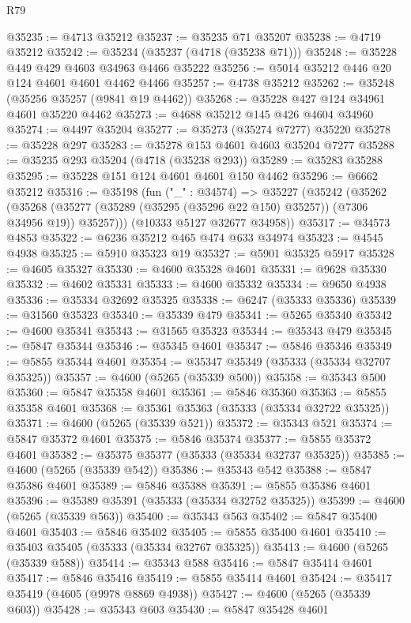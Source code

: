 \begin{lexlean}{R79}
\begin{coremodule}
@35235 := @4713 @35212
@35237 := @35235 @71 @35207
@35238 := @4719 @35212
@35242 := @35234 (@35237 (@4718 (@35238 @71)))
@35248 := @35228 @449 @429 @4603 @34963 @4466 @35222
@35256 := @5014 @35212 @446 @20 @124 @4601 @4601 @4462 @4466
@35257 := @4738 @35212
@35262 := @35248 (@35256 @35257 (@9841 @19 @4462))
@35268 := @35228 @427 @124 @34961 @4601 @35220 @4462
@35273 := @4688 @35212 @145 @426 @4604 @34960
@35274 := @4497 @35204
@35277 := @35273 (@35274 @7277) @35220
@35278 := @35228 @297
@35283 := @35278 @153 @4601 @4603 @35204 @7277
@35288 := @35235 @293 @35204 (@4718 (@35238 @293))
@35289 := @35283 @35288
@35295 := @35228 @151 @124 @4601 @4601 @150 @4462
@35296 := @6662 @35212
@35316 := @35198
    (fun ("_" : @34574) =>
    @35227
      (@35242
        (@35262
          (@35268 (@35277 (@35289 (@35295 (@35296 @22 @150) @35257)) (@7306 @34956 @19)) @35257)))
      (@10333 @5127 @32677 @34958))
@35317 := @34573 @4853
@35322 := @6236 @35212 @465 @474 @633 @34974
@35323 := @4545 @4938
@35325 := @5910 @35323 @19
@35327 := @5901 @35325 @5917
@35328 := @4605 @35327
@35330 := @4600 @35328 @4601
@35331 := @9628 @35330
@35332 := @4602 @35331
@35333 := @4600 @35332
@35334 := @9650 @4938
@35336 := @35334 @32692 @35325
@35338 := @6247 (@35333 @35336)
@35339 := @31560 @35323
@35340 := @35339 @479
@35341 := @5265 @35340
@35342 := @4600 @35341
@35343 := @31565 @35323
@35344 := @35343 @479
@35345 := @5847 @35344
@35346 := @35345 @4601
@35347 := @5846 @35346
@35349 := @5855 @35344 @4601
@35354 := @35347 @35349 (@35333 (@35334 @32707 @35325))
@35357 := @4600 (@5265 (@35339 @500))
@35358 := @35343 @500
@35360 := @5847 @35358 @4601
@35361 := @5846 @35360
@35363 := @5855 @35358 @4601
@35368 := @35361 @35363 (@35333 (@35334 @32722 @35325))
@35371 := @4600 (@5265 (@35339 @521))
@35372 := @35343 @521
@35374 := @5847 @35372 @4601
@35375 := @5846 @35374
@35377 := @5855 @35372 @4601
@35382 := @35375 @35377 (@35333 (@35334 @32737 @35325))
@35385 := @4600 (@5265 (@35339 @542))
@35386 := @35343 @542
@35388 := @5847 @35386 @4601
@35389 := @5846 @35388
@35391 := @5855 @35386 @4601
@35396 := @35389 @35391 (@35333 (@35334 @32752 @35325))
@35399 := @4600 (@5265 (@35339 @563))
@35400 := @35343 @563
@35402 := @5847 @35400 @4601
@35403 := @5846 @35402
@35405 := @5855 @35400 @4601
@35410 := @35403 @35405 (@35333 (@35334 @32767 @35325))
@35413 := @4600 (@5265 (@35339 @588))
@35414 := @35343 @588
@35416 := @5847 @35414 @4601
@35417 := @5846 @35416
@35419 := @5855 @35414 @4601
@35424 := @35417 @35419 (@4605 (@9978 @8869 @4938))
@35427 := @4600 (@5265 (@35339 @603))
@35428 := @35343 @603
@35430 := @5847 @35428 @4601

\end{coremodule}
\end{lexlean}
